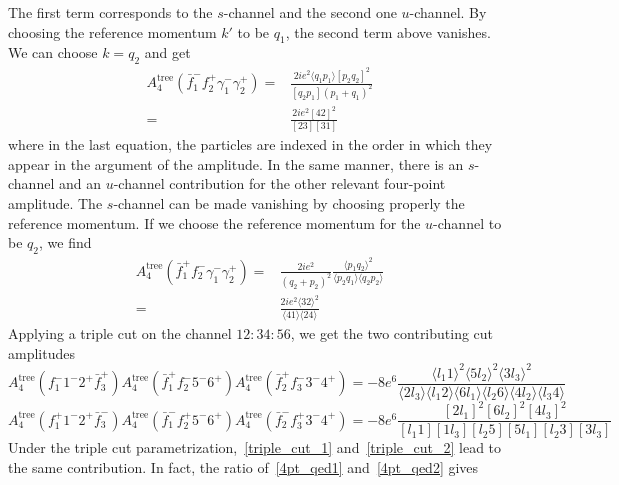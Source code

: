The first term corresponds to the $s$-channel and the second one $u$-channel.
By choosing the reference momentum $k'$ to be $q_1$, the second term above vanishes. 
We can choose $k = q_2$ and get 
\begin{equation}\label{4pt_qed1}
\begin{split}
A_{4}^{\mathrm{tree}}(\bar{f}_1^- f_2^+ \gamma_1^-\gamma_2^+) 
= &
\frac{2ie^2\langle q_1 p_1 \rangle[p_2 q_2]^2}{[q_2 p_1](p_1+q_1)^2}
\\ 
= &
\frac{2ie^2[42]^2}{[23][31]}
\end{split}
\end{equation}
where in the last equation, the particles are indexed in the order in which they appear in the argument of the amplitude.
In the same manner, there is an $s$-channel and an $u$-channel contribution for the other relevant four-point amplitude. 
The $s$-channel can be made vanishing by choosing properly the reference momentum. 
If we choose the reference momentum for the $u$-channel to be $q_2$, we find 
\begin{equation}\label{4pt_qed2}
\begin{split}
A_4^{\mathrm{tree}}(\bar{f}_1^+ f_2^- \gamma_1^- \gamma_2^+) = & \frac{2ie^2}{(q_2+p_2)^2}\frac{\langle p_1q_2\rangle^2}{\langle p_2q_1\rangle\langle q_2p_2\rangle}
\\
= &
\frac{2ie^2\langle 32\rangle^2}{\langle 41 \rangle\langle 24\rangle}
\end{split}
\end{equation}
Applying a triple cut on the channel $12:34:56$, we get the two contributing cut amplitudes
\begin{equation}\label{triple_cut_1}
A_{4}^{\mathrm{tree}}(f_1^- 1^-2^+\bar{f}_3^+)
A_4^{\mathrm{tree}}(\bar{f}_1^+f_2^-5^-6^+)
A_4^{\mathrm{tree}}(\bar{f}_2^+ f_3^-3^-4^+)
=
-8e^6\frac{\langle l_1 1\rangle^2 \langle 5l_2 \rangle^2\langle 3l_3\rangle^2}{\langle2 l_3\rangle\langle l_1 2\rangle\langle 6 l_1 \rangle\langle l_2 6\rangle\langle 4 l_2\rangle\langle l_3 4\rangle}
\end{equation}
\begin{equation}\label{triple_cut_2}
A_{4}^{\mathrm{tree}}(f_1^+ 1^-2^+\bar{f}_3^-)
A_4^{\mathrm{tree}}(\bar{f}_1^-f_2^+5^-6^+)
A_4^{\mathrm{tree}}(\bar{f}_2^- f_3^+3^-4^+)
=
-8e^6\frac{[2l_1]^2[6l_2]^2[4l_3]^2}{[l_1 1 ][1l_3][l_2 5][5l_1][l_2 3][3l_3]}
\end{equation}
Under the triple cut parametrization,~\cref{triple_cut_1} and~\cref{triple_cut_2} lead to the same contribution. 
In fact, the ratio of~\cref{4pt_qed1} and~\cref{4pt_qed2} gives
\begin{equation*}
\end{equation*} 












